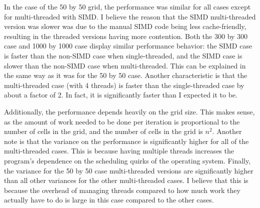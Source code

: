 In the case of the 50 by 50 grid, the performance was similar for all cases
except for multi-threaded with SIMD. I believe the reason that the SIMD multi-threaded version was slower was
due to the manual SIMD code being less cache-friendly, resulting in the threaded versions having more contention.
Both the 300 by 300 case and 1000 by 1000 case display similar performance behavior: the SIMD case is faster than
the non-SIMD case when single-threaded, and the SIMD case is slower than the non-SIMD case when multi-threaded.
This can be explained in the same way as it was for the 50 by 50 case. Another characteristic is that the multi-threaded
case (with 4 threads) is faster than the single-threaded case by about a factor of 2. In fact, it is significantly faster than I expected it to be.

Additionally, the performance depends heavily on the grid size. This makes sense, as the amount of work needed to be
done per iteration is proportional to the number of cells in the grid, and the number of cells in the grid is $n^2$.
Another note is that the variance on the performance is significantly higher for all of the multi-threaded cases.
This is because having multiple threads increases the program's dependence on the scheduling quirks of the operating
system. Finally, the variance for the 50 by 50 case multi-threaded versions are significantly higher than all other
variances for the other multi-threaded cases. I believe that this is because the overhead of managing threads compared
to how much work they actually have to do is large in this case compared to the other cases.

\vspace{5mm}

